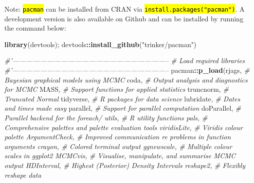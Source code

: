\documentclass[
]{article}
\newenvironment{Shaded}{\begin{snugshade}}{\end{snugshade}}
\newcommand{\CommentTok}[1]{\textcolor[rgb]{0.56,0.35,0.01}{\textit{#1}}}
\newcommand{\KeywordTok}[1]{\textcolor[rgb]{0.13,0.29,0.53}{\textbf{#1}}}
\newcommand{\NormalTok}[1]{#1}
\newcommand{\OperatorTok}[1]{\textcolor[rgb]{0.81,0.36,0.00}{\textbf{#1}}}
\newcommand{\StringTok}[1]{\textcolor[rgb]{0.31,0.60,0.02}{#1}}
\begin{document}
Note: \textcolor{codecolor}{\texttt{\hl{pacman}}} can be installed from CRAN via \textcolor{codecolor}{\texttt{\hl{install.packages("pacman")}}}. A development version is also available on Github and can be installed by running the command below:

\begin{Shaded}
\begin{Highlighting}[]
\KeywordTok{library}\NormalTok{(devtools); devtools}\OperatorTok{::}\KeywordTok{install_github}\NormalTok{(}\StringTok{"trinker/pacman"}\NormalTok{)}
\end{Highlighting}
\end{Shaded}

\begin{Shaded}
\begin{Highlighting}[]
\CommentTok{#'--------------------------------------------------------------------}
\CommentTok{# Load required libraries}
\CommentTok{#'--------------------------------------------------------------------}
\NormalTok{pacman}\OperatorTok{::}\KeywordTok{p_load}\NormalTok{(rjags,          }\CommentTok{# Bayesian graphical models using MCMC}
\NormalTok{               coda,           }\CommentTok{# Output analysis and diagnostics for MCMC}
\NormalTok{               MASS,           }\CommentTok{# Support functions for applied statistics}
\NormalTok{               truncnorm,      }\CommentTok{# Truncated Normal}
\NormalTok{               tidyverse,      }\CommentTok{# R packages for data science}
\NormalTok{               lubridate,      }\CommentTok{# Dates and times made easy}
\NormalTok{               parallel,       }\CommentTok{# Support for parallel computation}
\NormalTok{               doParallel,     }\CommentTok{# Parallel backend for the foreach/%
\NormalTok{               utils,          }\CommentTok{# R utility functions}
\NormalTok{               pals,           }\CommentTok{# Comprehensive palettes and palette evaluation tools}
\NormalTok{               viridisLite,    }\CommentTok{# Viridis colour palette}
\NormalTok{               ArgumentCheck,  }\CommentTok{# Improved communication re problems in function arguments         }
\NormalTok{               crayon,         }\CommentTok{# Colored terminal output}
\NormalTok{               ggnewscale,     }\CommentTok{# Multiple colour scales in ggplot2}
\NormalTok{               MCMCvis,        }\CommentTok{# Visualise, manipulate, and summarise MCMC output}
\NormalTok{               HDInterval,     }\CommentTok{# Highest (Posterior) Density Intervals }
\NormalTok{               reshape2,       }\CommentTok{# Flexibly reshape data}
}
\end{Highlighting}
\end{Shaded}
\end{document}
